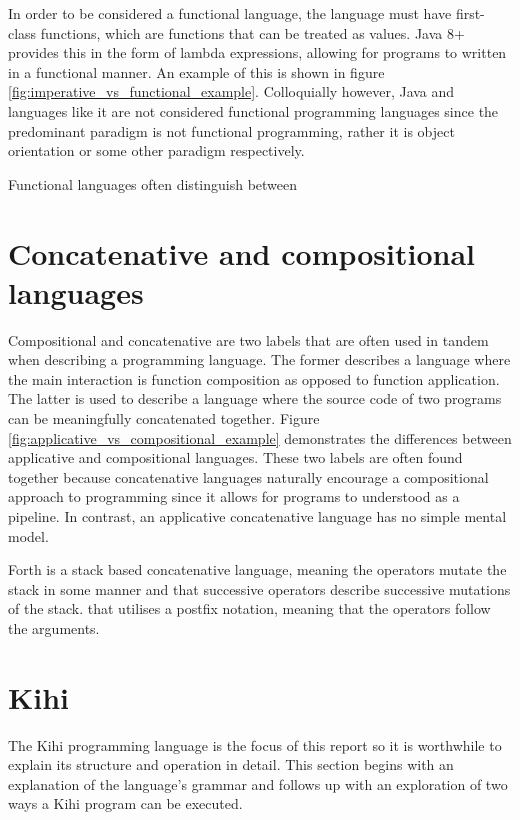 In order to be considered a functional language, the language must have first-class functions, which are functions that can be treated as values. Java 8+ provides this in the form of lambda expressions, allowing for programs to written in a functional manner. An example of this is shown in figure \ref{fig:imperative_vs_functional_example}. Colloquially however, Java and languages like it are not considered functional programming languages since the predominant paradigm is not functional programming, rather it is object orientation or some other paradigm respectively.

Functional languages often distinguish between 


\section{Concatenative and compositional languages} 
Compositional and concatenative are two labels that are often used in tandem when describing a programming language. The former describes a language where the main interaction is function composition as opposed to function application. The latter is used to describe a language where the source code of two programs can be meaningfully concatenated together. Figure \ref{fig:applicative_vs_compositional_example} demonstrates the differences between applicative and compositional languages. These two labels are often found together because concatenative languages naturally encourage a compositional approach to programming since it allows for programs to understood as a pipeline. In contrast, an applicative concatenative language has no simple mental model.

Forth is a stack based concatenative language, meaning the operators mutate the stack in some manner and that successive operators describe successive mutations of the stack.  that utilises a postfix notation, meaning that the operators follow the arguments.









\section{Kihi}
The Kihi programming language is the focus of this report so it is worthwhile to explain its structure and operation in detail. This section begins with an explanation of the language's grammar and follows up with an exploration of two ways a Kihi program can be executed.

